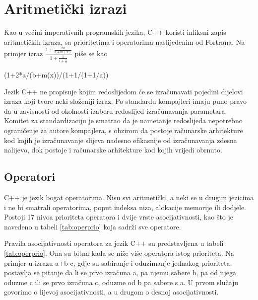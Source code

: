 \documentclass[11pt]{book}
\begin{document}
\section{Aritmetički izrazi}

Kao u većini imperativnih programskih jezika, C++ koristi infiksni zapis aritmetičkih izraza, sa prioritetima i operatorima naslijeđenim od Fortrana. Na primjer izraz $\frac{1+\frac{2a}{b+m(x)}}{1+\frac{1}{1+\frac{1}{a}}}$ piše se kao

\begin{shortlisting}
  (1+2*a/(b+m(x))/(1+1/(1+1/a))
\end{shortlisting}

Jezik C++ ne propisuje kojim redoslijedom će se izračunavati pojedini dijelovi izraza koji tvore neki složeniji izraz. Po standardu kompajleri imaju puno pravo da u zavisnosti od okolnosti izaberu  redoslijed  izračunavanja  parametara. Komitet  za  standardizaciju je  smatrao da je nametanje redoslijeda nepotrebno ograničenje za autore kompajlera, s obzirom da postoje računarske arhitekture kod kojih je izračunavanje slijeva nadesno efikasnije od izračunavanja zdesna nalijevo, dok postoje i računarske arhitekture kod kojih vrijedi obrnuto.

\subsection{Operatori}

C++ je jezik bogat operatorima. Nisu svi aritmetički, a neki se u drugim jezicima i ne bi smatrali operatorima, poput indeksa niza, alokacije memorije ili dodjele. Postoji 17 nivoa prioriteta operatora i dvije vrste asocijativnosti, kao što je navedeno u tabeli \ref {tab:operprio} koja sadrži sve operatore.

Pravila  asocijativnosti  operatora  za  jezik  C++  su  predstavljena  u  tabeli  \ref {tab:operprio}.  Ona su bitna kada se niže više operatora istog prioriteta. Na  primjer  u izrazu a+b-c, gdje su sabiranje i oduzimanje jednakog prioriteta, postavlja se pitanje da li se prvo izračuna a, pa njemu sabere b, pa od njega oduzme c ili se prvo izračuna c, oduzme od b pa sabere s a. U prvom slučaju govorimo o lijevoj asocijativnosti, a u  drugom o desnoj asocijativnosti.
\end{document}
